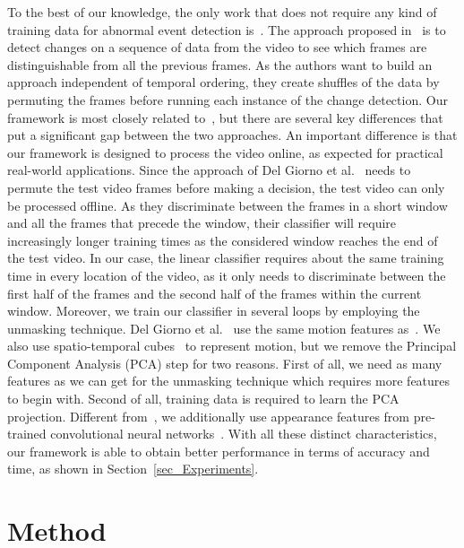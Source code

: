 \documentclass[10pt,twocolumn,letterpaper]{article}
\begin{document}
To the best of our knowledge, the only work that does not require any kind of training data for abnormal event detection is~\cite{Giorno-ECCV-2016}. The approach proposed in~\cite{Giorno-ECCV-2016} is to detect changes on a sequence of data from the video to see which frames are distinguishable from all the previous frames. As the authors want to build an approach independent of temporal ordering, they create shuffles of the data by permuting the frames before running each instance of the change detection. Our framework is most closely related to~\cite{Giorno-ECCV-2016}, but there are several key differences that put a significant gap between the two approaches. An important difference is that our framework is designed to process the video online, as expected for practical real-world applications. Since the approach of Del Giorno et al.~\cite{Giorno-ECCV-2016} needs to permute the test video frames before making a decision, the test video can only be processed offline. As they discriminate between the frames in a short window and all the frames that precede the window, their classifier will require increasingly longer training times as the considered window reaches the end of the test video. In our case, the linear classifier requires about the same training time in every location of the video, as it only needs to discriminate between the first half of the frames and the second half of the frames within the current window. Moreover, we train our classifier in several loops by employing the unmasking technique. Del Giorno et al.~\cite{Giorno-ECCV-2016} use the same motion features as~\cite{Lu-ICCV-2013}. We also use spatio-temporal cubes~\cite{Lu-ICCV-2013} to represent motion, but we remove the Principal Component Analysis (PCA) step for two reasons. First of all, we need as many features as we can get for the unmasking technique which requires more features to begin with. Second of all, training data is required to learn the PCA projection. Different from~\cite{Giorno-ECCV-2016}, we additionally use appearance features from pre-trained convolutional neural networks~\cite{Chatfield-BMVC-14}. With all these distinct characteristics, our framework is able to obtain better performance in terms of accuracy and time, as shown in Section~\ref{sec_Experiments}.

\section{Method}
\label{sec_Method}
\end{document}
